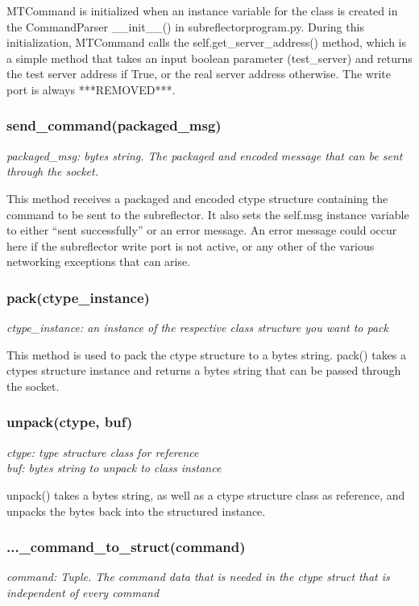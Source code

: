 \documentclass{article}
\begin{document}
MTCommand is initialized when an instance variable for the class is created in the CommandParser \_\_init\_\_() in subreflector\-program.py. During this initialization, MTCommand calls the self.get\_server\_address() method, which is a simple method that takes an input boolean parameter (test\_server) and returns the test  server address if True, or the real server address otherwise. The write port is always ***REMOVED***.

\subsubsection*{send\_command(packaged\_msg)}
\emph{packaged\_msg: bytes string. The packaged and encoded message that can be sent through the socket.} 
\vspace{10pt}

This method receives a packaged and encoded ctype structure containing the command to be sent to the subreflector. It also sets the self.msg instance variable to either ``sent successfully'' or an error message. An error message could occur here if the subreflector write port is not active, or any other of the various networking exceptions that can arise. 


\subsubsection*{pack(ctype\_instance)}
\emph{ctype\_instance: an instance of the respective class structure you want to pack}
\vspace{10pt}

This method is used to pack the ctype structure to a bytes string. pack() takes a ctypes structure instance and  returns a bytes string that can be passed through the socket. 


\subsubsection*{unpack(ctype, buf)}
\emph{ctype: type structure class for reference}\\
\emph{buf: bytes string to unpack to class instance}
\vspace{10pt}

unpack() takes a bytes string, as well as a ctype structure class as reference, and unpacks the bytes back into the structured instance.

\subsubsection*{...\_command\_to\_struct(command)}
\emph{command: Tuple. The command data that is needed in the ctype struct that is independent of every command}
\vspace{10pt}
\end{document}
